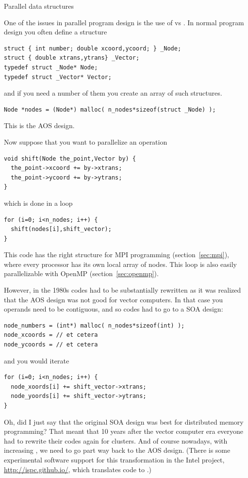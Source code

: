  {Parallel data structures}

One of the issues in parallel program design is the use of
 vs . In normal
program design you often define a structure
\begin{verbatim}
struct { int number; double xcoord,ycoord; } _Node;
struct { double xtrans,ytrans} _Vector;
typedef struct _Node* Node;
typedef struct _Vector* Vector;
\end{verbatim}
and if you need a number of them you create an array of such structures.
\begin{verbatim}
Node *nodes = (Node*) malloc( n_nodes*sizeof(struct _Node) );
\end{verbatim}
This is the AOS design.

Now suppose that you want to parallelize an operation
\begin{verbatim}
void shift(Node the_point,Vector by) {
  the_point->xcoord += by->xtrans;
  the_point->ycoord += by->ytrans;
}
\end{verbatim}
which is done in a loop
\begin{verbatim}
for (i=0; i<n_nodes; i++) {
  shift(nodes[i],shift_vector);
}
\end{verbatim}
This code has the right structure for MPI programming
(section~\ref{sec:mpi}), where every processor has its own local array
of nodes. This loop is also easily parallelizable with OpenMP
(section~\ref{sec:openmp}).

However, in the 1980s codes had to be substantially rewritten as it
was realized that the AOS design was not good for vector computers.
In that case you operands need to be contiguous, and so codes had to 
go to a SOA design:
\begin{verbatim}
node_numbers = (int*) malloc( n_nodes*sizeof(int) );
node_xcoords = // et cetera
node_ycoords = // et cetera
\end{verbatim}
and you would iterate
\begin{verbatim}
for (i=0; i<n_nodes; i++) {
  node_xoords[i] += shift_vector->xtrans;
  node_yoords[i] += shift_vector->ytrans;
}
\end{verbatim}

Oh, did I just say that the original SOA design was best for
distributed memory programming?  That meant that 10 years after the
vector computer era everyone had to rewrite their codes again for
clusters. And of course nowadays, with
increasing , we need to go part way back to
the AOS design.
(There is some experimental software support for this transformation
in the Intel  project, \url{http://ispc.github.io/},
which translates  code to .)


